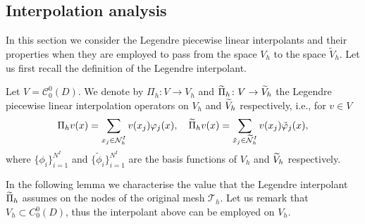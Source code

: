 \documentclass[10pt]{article}
\begin{document}
\subsection{Interpolation analysis}

In this section we consider the Legendre piecewise linear interpolants and their properties when they are employed to pass from the space $V_h$ to the space $\widetilde V_h$. Let us first recall the definition of the Legendre interpolant.

\begin{definition}\label{def:Legendre} Let $V = \mathcal C^0_0(D)$. We denote by $\Pi_h\colon V \to V_h$ and $\widetilde \Pi_h\colon V \to \widetilde V_h$ the Legendre piecewise linear interpolation operators on $V_h$ and $\widetilde V_h$ respectively, i.e., for $v \in V$
	\begin{equation}
	\Pi_h v(x) = \fsum{x_j \in \mathcal N_h^I} v(x_j) \phi_j(x), \quad	\btilde \Pi_h v(x) = \fsum{\tilde x_j \in \btilde {\mathcal N}_h^I} v(x_j) \tilde \phi_j(x),
	\end{equation}
	where $\{\phi_i\}_{i=1}^{N^I}$ and $\{\tilde \phi_i\}_{i=1}^{N^I}$ are the basis functions of $V_h$ and $\widetilde V_h$ respectively.
\end{definition}

In the following lemma we characterise the value that the Legendre interpolant $\widetilde \Pi_h$ assumes on the nodes of the original mesh $\mathcal T_h$. Let us remark that $V_h \subset C_0^0(D)$, thus the interpolant above can be employed on $V_h$.
\end{document}
